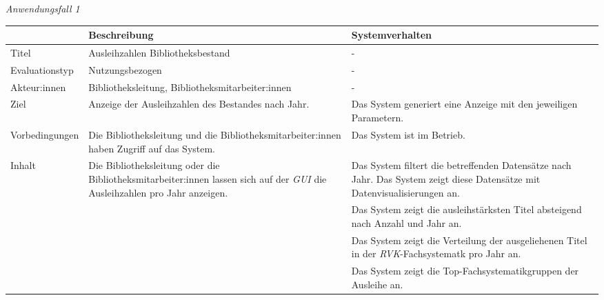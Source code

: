\noindent
\textit{Anwendungsfall 1}
\begingroup
\setlength{\tabcolsep}{10pt} %
\renewcommand{\arraystretch}{1.15} 
\begin{table}[h]
    \centering
    \begin{adjustbox}{max width=\textwidth}
    \begin{tabular}{lp{7.5cm}p{7.5cm}}
       \toprule
       \textbf{}          & \textbf{Beschreibung} &\textbf{Systemverhalten}\\
       \midrule
        Titel                            &Ausleihzahlen Bibliotheksbestand  & -\\
        Evaluationstyp                   &Nutzungsbezogen                   & -\\
        Akteur:innen                     &Bibliotheksleitung, Bibliotheksmitarbeiter:innen & -\\
        Ziel                             &Anzeige der Ausleihzahlen des Bestandes nach Jahr. & Das System generiert eine Anzeige mit den jeweiligen Parametern.\\
        Vorbedingungen                   &Die Bibliotheksleitung und die Bibliotheksmitarbeiter:innen haben Zugriff auf das System. & Das System ist im Betrieb.\\
        Inhalt                           &Die Bibliotheksleitung oder die Bibliotheksmitarbeiter:innen lassen sich auf der \textit{\acrshort{GUI}} die Ausleihzahlen pro Jahr anzeigen. & Das System filtert die betreffenden Datensätze nach Jahr. Das System zeigt diese Datensätze mit Datenvisualisierungen an.\\
                                         & &Das System zeigt die ausleihstärksten Titel absteigend nach Anzahl und Jahr an.\\
                                         & &Das System zeigt die Verteilung der ausgeliehenen Titel in der \textit{\acrshort{RVK}}-Fachsystematk pro Jahr an.\\
                                         & &Das System zeigt die Top-Fachsystematikgruppen der Ausleihe an.\\

\end{tabular}
\end{adjustbox}
\end{table}
